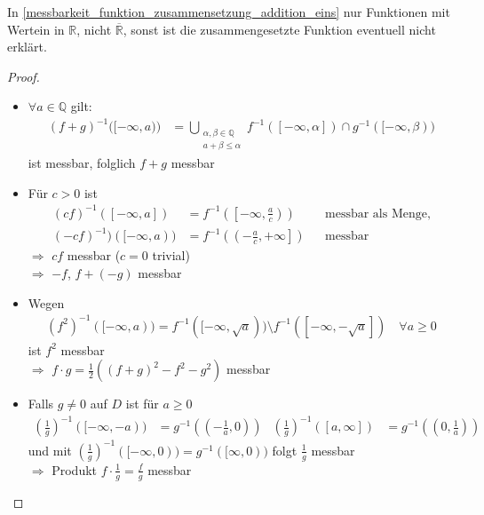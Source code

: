 \begin{underlinedenvironment}[Hinweis]
	In \ref{messbarkeit_funktion_zusammensetzung_addition_eins} nur Funktionen mit Wertein in $\mathbb{R}$, nicht $\overline{\mathbb{R}}$, sonst ist die zusammengesetzte Funktion eventuell nicht erklärt.
\end{underlinedenvironment}

\begin{proof}\hspace*{0pt}
	\NoEndMark
	\begin{itemize}
	\item $\forall a\in\mathbb{Q}$ gilt: \begin{align*}
		\left( f + g\right)^{-1}\big( [-\infty, a) \big) &= \bigcup\limits_{\substack{\alpha,\beta\in\mathbb{Q}\\ a + \beta \le \alpha}} f^ {-1} ([-\infty,\alpha])\cap g^{-1}([-\infty,\beta))
	\end{align*}
	ist messbar, folglich $f+g$ messbar
	
	\item Für $c > 0$ ist \begin{align*}
		(cf)^{-1}([-\infty, a]) &= f^{-1} \left(\left[ -\infty,\frac{a}{c}\right)\right)&&\text{messbar als Menge,} \\
		(-cf)^{-1}) ([-\infty,a)) &= f^{-1}\left( \left(-\frac{a}{c},+\infty \right]\right)&&\text{messbar}
	\end{align*}
	$\Rightarrow$ $cf$ messbar ($c=0$ trivial) \\
	$\Rightarrow$ $-f$, $f+(-g)$ messbar
	
	\item Wegen \begin{align*}\left(f^2\right)^{-1}([-\infty,a)) = f^{-1}([-\infty,\sqrt{a}))\setminus f^{-1}([-\infty,-\sqrt{a}])\quad \forall a\ge 0\end{align*} ist $f^2$ messbar \\
	$\Rightarrow$ $f\cdot g = \frac{1}{2}\left( (f+g)^2 - f^2 - g^2\right)$ messbar
	
	\item Falls $g\neq 0$ auf $D$ ist für $a\ge 0$ \begin{align*}
		\left( \frac{1}{g}\right)^{-1} ([-\infty, -a)) &= g^{-1}\left( \left( -\frac{1}{a}, 0\right)\right) & \left( \frac{1}{g}\right)^{-1} ([a,\infty]) &= g^{-1} \left( \left( 0,\frac{1}{a}\right) \right)
	\end{align*}
	und mit $\left( \frac{1}{g}\right)^{-1}([-\infty,0)) = g^{-1}([\infty, 0))$ folgt $\frac{1}{g}$ messbar \\
	$\Rightarrow$ Produkt $f\cdot \frac{1}{g} = \frac{f}{g}$ messbar
	

\end{itemize}
\end{proof}
